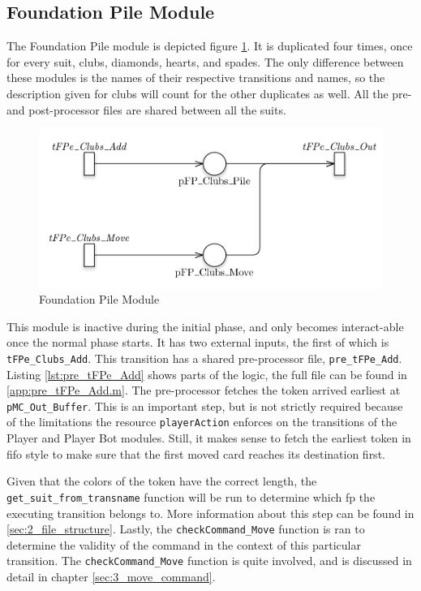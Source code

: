 \documentclass[runningheads,a4paper]{llncs}
\newcommand{\GPenSIM}{../GPenSIM}
\begin{document}
\subsection{Foundation Pile Module}
The Foundation Pile module is depicted figure \ref{fig:foundation_pile}. It is duplicated four times, once for every suit, clubs, diamonds, hearts, and spades. The only difference between these modules is the names of their respective transitions and names, so the description given for clubs will count for the other duplicates as well. All the pre- and post-processor files are shared between all the suits.
\newline
\begin{figure}
	\begin{center}
		\includegraphics[width=\textwidth]{images/foundationPile}
		\caption{Foundation Pile Module}
		\label{fig:foundation_pile}
	\end{center}
\end{figure}

This module is inactive during the initial phase, and only becomes interact-able once the normal phase starts. It has two external inputs, the first of which is \verb!tFPe_Clubs_Add!. This transition has a shared pre-processor file, \verb!pre_tFPe_Add!. Listing \ref{lst:pre_tFPe_Add} shows parts of the logic, the full file can be found in \ref{app:pre_tFPe_Add.m}. The pre-processor fetches the token arrived earliest at \verb!pMC_Out_Buffer!. This is an important step, but is not strictly required because of the limitations the resource \verb!playerAction! enforces on the transitions of the Player and Player Bot modules. Still, it makes sense to fetch the earliest token in \ac{fifo} style to make sure that the first moved card reaches its destination first. 
\newline

Given that the colors of the token have the correct length, the \verb!get_suit_from_transname! function will be run to determine which \ac{fp} the executing transition belongs to. More information about this step can be found in \ref{sec:2_file_structure}. Lastly, the \verb!checkCommand_Move! function is ran to determine the validity of the command in the context of this particular transition. The \verb!checkCommand_Move! function is quite involved, and is discussed in detail in chapter \ref{sec:3_move_command}.

\end{document}
